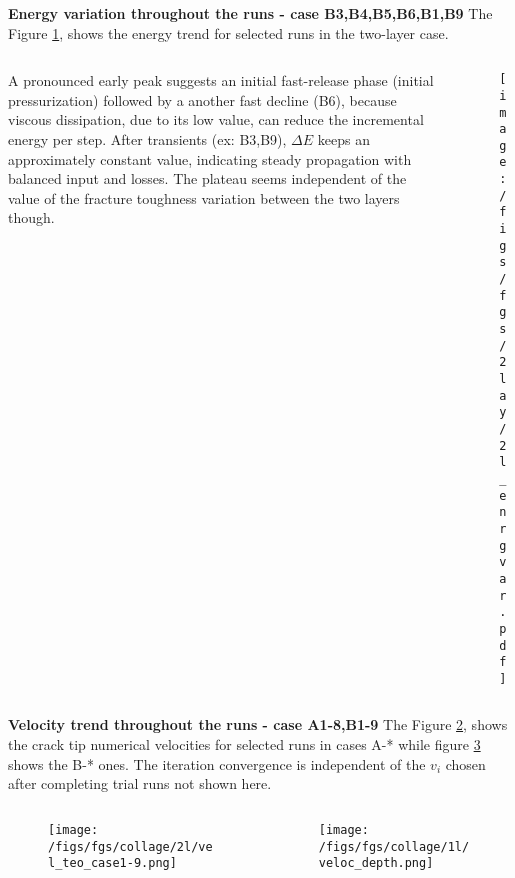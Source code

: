 \documentclass[9pt]{beamer}
\newcommand\Fontvi{\fontsize{6}{7.2}\selectfont}
\begin{document}
\begin{frame}{\textbf{Energy variation throughout the runs - case B3,B4,B5,B6,B1,B9}}
The Figure \ref{fig:5}, shows the energy trend for selected runs in the two-layer case.
\begin{columns}
\begin{column}{0.35\textwidth}
\Fontvi
A pronounced early peak suggests an initial fast-release phase (initial pressurization) followed by a another fast decline (B6), because viscous dissipation, due to its low value, can reduce the incremental energy per step. After transients (ex: B3,B9), $\Delta E$ keeps an approximately constant value, indicating steady propagation with balanced input and losses. The plateau seems independent of the value of the fracture toughness variation between the two layers though.
\end{column}
\begin{column}{0.8\textwidth}
    \begin{figure}
    \centering
        \texttt{[image: /figs/fgs/2lay/2l\_enrgvar.pdf]}
            \label{fig:5}
    \end{figure}
\end{column}
\end{columns}
\end{frame}

\begin{frame}{\textbf{Velocity trend throughout the runs - case A1-8,B1-9}}
\Fontvi
The Figure \ref{fig:6}, shows the crack tip numerical velocities for selected runs in cases A-* while figure \ref{fig:7} shows the B-* ones. The iteration convergence is independent of the $v_i$ chosen after completing trial runs not shown here.
\begin{columns}
\begin{column}{0.6\textwidth}
    \begin{figure}
    \centering
        \texttt{[image: /figs/fgs/collage/2l/vel\_teo\_case1-9.png]}
            \label{fig:6}
    \end{figure}
\end{column}
\begin{column}{0.6\textwidth}
    \begin{figure}
    \centering
        \texttt{[image: /figs/fgs/collage/1l/veloc\_depth.png]}
            \label{fig:7}
    \end{figure}
\end{column}
\end{columns}
\end{frame}
\end{document}
